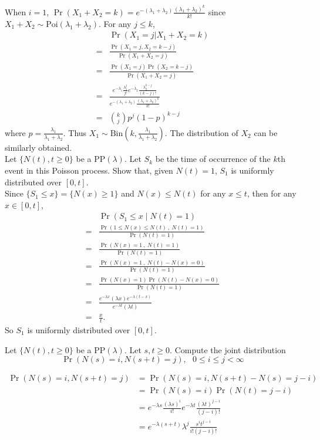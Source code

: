 \documentclass[  11pt]{article}
\newcommand{\p}{ {\Pr}}
\newcommand{\PP}{\mbox{PP}}
\newcommand{\cPr}[2]{{\Pr\left(#1\mid #2\right)}}
\newcommand{\Poi}{\mbox{Poi}}
\newcommand{\Bin}{\mbox{Bin}}
\newcommand{\la}{\lambda}
\begin{document}
\begin{ExerciseList}
When $i=1$, $\p(X_1+X_2=k) = e^{-(\la_1+\la_2)} \frac{(\la_1+\la_2)^k}{k!}$
since $X_1+X_2\sim \Poi(\la_1+\la_2)$. For any $j\leq k$,
\[\begin{split}
&\p(X_1=j|X_1+X_2=k) \\
= & \frac{\p(X_1=j, X_2=k-j)}{\p(X_1+X_2=j)} \\
= & \frac{\p(X_1=j) \p( X_2=k-j)}{\p(X_1+X_2=j)} \\
= &\frac{e^{-\la_1}\frac{\la_1^j}{j!}e^{-\la_2}\frac{\la_2^{k-j}}{(k-j)!} }{e^{-(\la_1+\la_2)}\frac{(\la_1+\la_2)^k}{k!}}\\
= & {k \choose j} p^{j}(1-p)^{k-j} 
\end{split}\]
where  $p=\frac{\la_1}{\la_1+\la_2}$.
Thus $X_1\sim \Bin(k,\frac{\lambda_1}{\lambda_1+\lambda_2})$. 
The distribution of $X_2$ can be similarly obtained.\\

\Exercise [origin={3.17, p79}] 
  Let $\{N(t), t\ge 0\}$ be a $\PP(\lambda)$. Let $S_k$ be the time of occurrence of the $k$th event in this Poisson process. Show that, given $N(t)=1$, $S_1$ is uniformly distributed over $[0,t]$.\\

\Answer
Since $\{S_1 \leq x\} =\{N(x)\geq 1\}$ and 
 $N(x)\leq N(t)$ for any $x\leq t$,
 then for any $x\in [0,t]$,
\[\begin{split}
&\cPr{S_1\le x}{ N(t)=1} \\
= &\frac{\p( 1 \leq  N(x) \leq N(t) \ , \ N(t)=1)}{\p(N(t)=1)}\\
= &\frac{\p(  N(x) =1 \ ,\ N(t)=1)}{\p(N(t)=1)}
\\
= & \frac{\p(  N(x) =1 \ ,\ N(t)-N(x)=0)}{\p(N(t)=1)}
\\
=  &\frac{\p(  N(x) =1) \p ( N(t)-N(x)=0)}{\p(N(t)=1)}
\\
=& \frac{e^{-\la x} (\la x) e^{-\la(t-x)}}{e^{-\la t}(\la t)}\\
= & \frac{x}{t}.
\end{split}\]
So $S_1$ is uniformly distributed over $[0,t]$.
  
 
\Exercise [origin={3.19, p80}] 
Let $\{N(t), t\ge 0 \}$ be a $\PP(\lambda)$. Let $s,t\ge 0$. Compute the joint distribution
$$\p(N(s) = i, N(s+t) = j), ~~~0\le i\le j< \infty$$

\Answer
\[\begin{split}
\p(N(s) = i, N(s+t) = j) &= \p(N(s)=i, N(s+t)-N(s)=j-i) \\
&= \p(N(s)=i)\p(N(t)=j-i)\\
&= e^{-\la s} \frac{(\la s)^i}{i!} e^{-\la t}\frac{(\la t)^{j-i}}{(j-i)!}\\
&= e^{-\la(s+t)}\la^j \frac{s^i t^{j-i}}{i!(j-i)!}
\end{split}\]


\end{ExerciseList}
\end{document}
